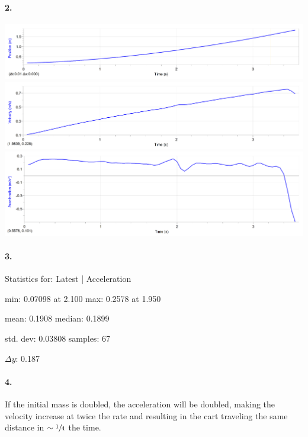     \paragraph*{2.}

    \begin{mdframed}
        \centering\includegraphics[width=\textwidth]{image17}
        \centering\includegraphics[width=\textwidth]{image10}
        \centering\includegraphics[width=\textwidth]{image7}
    \end{mdframed}

    \paragraph*{3.}

    \begin{mdframed}
        Statistics for: Latest | Acceleration

        min: 0.07098 at 2.100 max: 0.2578 at 1.950

        mean: 0.1908 median: 0.1899

        std. dev: 0.03808 samples: 67

        $\Delta y$: 0.187       
    \end{mdframed}

    \paragraph*{4.}

    \begin{mdframed}
        If the initial mass is doubled, the acceleration will be doubled, making the velocity increase at twice the rate and resulting in the cart traveling the same distance in $\sim\sfrac{1}{4}$ the time.
    \end{mdframed}

